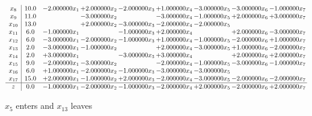 \documentclass[10pt]{article}
\begin{document}
\[\begin{array}{c| c c@{\hskip 2pt} c@{\hskip 2pt} c@{\hskip 2pt} c@{\hskip 2pt} c@{\hskip 2pt} c@{\hskip 2pt} c@{\hskip 2pt} }
 x_{8}   &  10.0 & -2.000000 x_{1} & + 2.000000 x_{2} & -2.000000 x_{3} & + 1.000000 x_{4} & -3.000000 x_{5} & -3.000000 x_{6} & -1.000000 x_{7}\\
 x_{9}   &  11.0  &   & -3.000000 x_{2} &   & -3.000000 x_{4} & -1.000000 x_{5} & + 2.000000 x_{6} & + 3.000000 x_{7}\\
 x_{10}   &  13.0  &   & + 2.000000 x_{2} & -3.000000 x_{3} & -2.000000 x_{4} & -2.000000 x_{5} &    &   \\
 x_{11}   &  6.0 & -1.000000 x_{1} &   & -1.000000 x_{3} & + 2.000000 x_{4} &   & + 2.000000 x_{6} & -3.000000 x_{7}\\
 x_{12}   &  6.0 & -3.000000 x_{1} & -2.000000 x_{2} & -1.000000 x_{3} & + 1.000000 x_{4} & -1.000000 x_{5} & -2.000000 x_{6} & + 1.000000 x_{7}\\
 x_{13}   &  2.0 & -3.000000 x_{1} & -1.000000 x_{2} &   & + 2.000000 x_{4} & -3.000000 x_{5} & + 1.000000 x_{6} & -2.000000 x_{7}\\
 x_{14}   &  2.0 & + 3.000000 x_{1} &   & -3.000000 x_{3} & + 3.000000 x_{4} &   & + 2.000000 x_{6} & + 2.000000 x_{7}\\
 x_{15}   &  9.0 & -2.000000 x_{1} & -3.000000 x_{2} &   & -2.000000 x_{4} & -1.000000 x_{5} & -3.000000 x_{6} & -1.000000 x_{7}\\
 x_{16}   &  6.0 & + 1.000000 x_{1} & -2.000000 x_{2} & -1.000000 x_{3} & -3.000000 x_{4} & -3.000000 x_{5} &    &   \\
 x_{17}   &  15.0 & + 2.000000 x_{1} & -1.000000 x_{2} & + 2.000000 x_{3} & -2.000000 x_{4} & -3.000000 x_{5} & -2.000000 x_{6} & -2.000000 x_{7}\\
\hline
z    &  0.0 & -1.000000 x_{1} & -2.000000 x_{2} & -1.000000 x_{3} & -2.000000 x_{4} & + 2.000000 x_{5} & -2.000000 x_{6} & + 2.000000 x_{7}\\
\end{array}\]


 $ x_{5} $ enters and $ x_{13} $ leaves 
\end{document}
